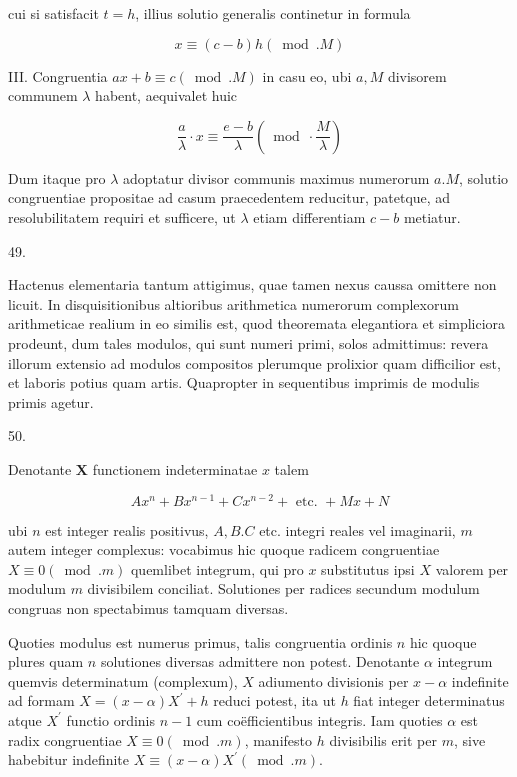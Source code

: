\documentclass[10pt]{article}
\begin{document}
cui si satisfacit \(t=h\), illius solutio generalis continetur in formula

\[
x \equiv(c-b) h(\bmod . M)
\]

III. Congruentia \(a x+b \equiv c(\bmod . M)\) in casu eo, ubi \(a, M\) divisorem communem \(\lambda\) habent, aequivalet huic

\[
\frac{a}{\lambda} \cdot x \equiv \frac{e-b}{\lambda}\left(\bmod \cdot \frac{M}{\lambda}\right)
\]

Dum itaque pro \(\lambda\) adoptatur divisor communis maximus numerorum \(a . M\), solutio congruentiae propositae ad casum praecedentem reducitur, patetque, ad resolubilitatem requiri et sufficere, ut \(\lambda\) etiam differentiam \(c-b\) metiatur.

49.

Hactenus elementaria tantum attigimus, quae tamen nexus caussa omittere non licuit. In disquisitionibus altioribus arithmetica numerorum complexorum arithmeticae realium in eo similis est, quod theoremata elegantiora et simpliciora prodeunt, dum tales modulos, qui sunt numeri primi, solos admittimus: revera illorum extensio ad modulos compositos plerumque prolixior quam difficilior est, et laboris potius quam artis. Quapropter in sequentibus imprimis de modulis primis agetur.

50.

Denotante \(\boldsymbol{X}\) functionem indeterminatae \(x\) talem

\[
A x^{n}+B x^{n-1}+C x^{n-2}+\text { etc. }+M x+N
\]

ubi \(n\) est integer realis positivus, \(A, B . C\) etc. integri reales vel imaginarii, \(m\) autem integer complexus: vocabimus hic quoque radicem congruentiae \(X \equiv 0(\bmod . m)\) quemlibet integrum, qui pro \(x\) substitutus ipsi \(X\) valorem per modulum \(m\) divisibilem conciliat. Solutiones per radices secundum modulum congruas non spectabimus tamquam diversas.

Quoties modulus est numerus primus, talis congruentia ordinis \(n\) hic quoque plures quam \(n\) solutiones diversas admittere non potest. Denotante \(\alpha\) integrum quemvis determinatum (complexum), \(X\) adiumento divisionis per \(x-\alpha\) indefinite ad formam \(X=(x-\alpha) X^{\prime}+h\) reduci potest, ita ut \(h\) fiat integer determinatus atque \(X^{\prime}\) functio ordinis \(n-1\) cum coëfficientibus integris. Iam quoties \(\alpha\) est radix congruentiae \(X \equiv 0(\bmod . m)\), manifesto \(h\) divisibilis erit per \(m\), sive habebitur indefinite \(X \equiv(x-\alpha) X^{\prime}(\bmod . m)\).
\end{document}
